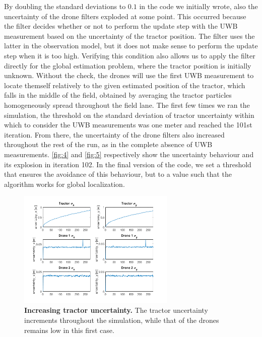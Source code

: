 \documentclass[letterpaper,twocolumn,10pt]{article}
\begin{document}
By doubling the standard deviations to $0.1$ in the code we initially wrote, also the uncertainty of the drone filters exploded at some point. This occurred because the filter decides whether or not to perform the update step with the UWB measurement based on the uncertainty of the tractor position. The filter uses the latter in the observation model, but it does not make sense to perform the update step when it is too high. Verifying this condition also allows us to apply the filter directly for the global estimation problem, where the tractor position is initially unknown.
Without the check, the drones will use the first UWB measurement to locate themself relatively to the given estimated position of the tractor, which falls in the middle of the field, obtained by averaging the tractor particles homogeneously spread throughout the field lane. The first few times we ran the simulation, the threshold on the standard deviation of tractor uncertainty within which to consider the UWB measurements was one meter and reached the 101st iteration. From there, the uncertainty of the drone filters also increased throughout the rest of the run, as in the complete absence of UWB measurements. \autoref{fig:4} and \autoref{fig:5} respectively show the uncertainty behaviour and its explosion in iteration 102. In the final version of the code, we set a threshold that ensures the avoidance of this behaviour, but to a value such that the algorithm works for global localization.

\begin{figure}[p]
    \centering
     \includegraphics[width=7.5cm]{images/noGNSS_medium_noise_uncertainties.png}
     \caption{\textbf{Increasing tractor uncertainty.} The tractor uncertainty increments throughout the simulation, while that of the drones remains low in this first case. }
    \label{fig:3}
\end{figure}
\end{document}
